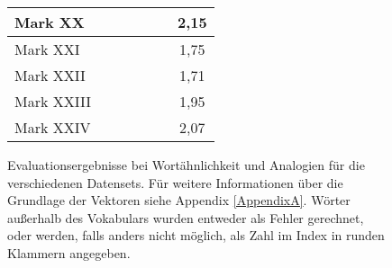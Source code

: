 \begin{landscape}
\begin{figure}[h]
\begin{tabular}{l||c|c|c|c||c|c}
      \hline
      Mark XX &  & & & & & 2,15 \\
      \hline
      Mark XXI &  & & & & & 1,75 \\
      \hline
      Mark XXII &  & & & & & 1,71 \\
      \hline
      Mark XXIII &  & & & & & 1,95 \\
      \hline
      Mark XXIV & & & & & & 2,07 \\
    \end{tabular}
    \caption[Evaluationsergebnisse bei Wortähnlichkeit und Analogien]{Evaluationsergebnisse bei Wortähnlichkeit und Analogien für die verschiedenen Datensets. Für weitere
    Informationen über die Grundlage der Vektoren siehe Appendix \ref{AppendixA}. Wörter außerhalb des Vokabulars wurden entweder als Fehler gerechnet, oder
    werden, falls anders nicht möglich, als Zahl im Index in runden Klammern angegeben.}
  \end{figure}
\end{landscape}
\newpage
